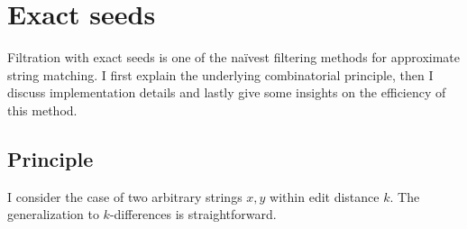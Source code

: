 



\section{Exact seeds}
\label{sec:filtering:exact}

Filtration with exact seeds is one of the na\"ivest filtering methods for approximate string matching.
I first explain the underlying combinatorial principle, then I discuss implementation details and lastly give some insights on the efficiency of this method.

\subsection{Principle}

I consider the case of two arbitrary strings $x,y$ within edit distance $k$.
The generalization to $k$-differences is straightforward.

